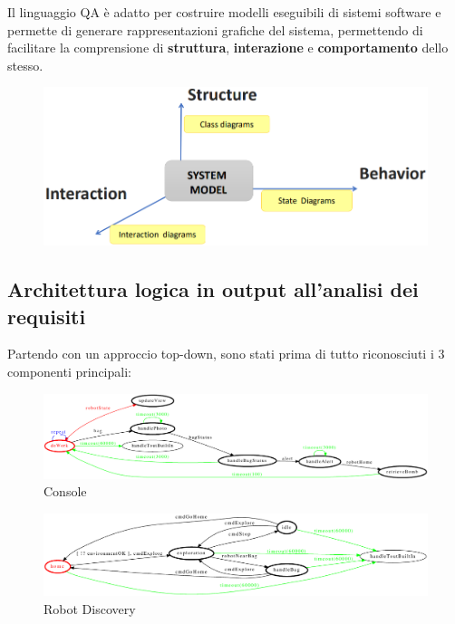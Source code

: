 Il linguaggio QA è adatto per costruire modelli eseguibili di sistemi software e permette di generare rappresentazioni grafiche del sistema,
permettendo di facilitare la comprensione di \textbf{struttura}, \textbf{interazione} e \textbf{comportamento} dello stesso.

\begin{figure}[H]
  \centering
  \includegraphics[width=1\textwidth]{res/logicalArchitecture.png}%
  \label{fig:logicalArchitecture}
\end{figure}

\subsection{Architettura logica in output all'analisi dei requisiti}

Partendo con un approccio top-down, sono stati prima di tutto riconosciuti i 3 componenti principali:

\begin{figure}[H]
  \centering
  \includegraphics[width=\textwidth]{res/sprint1/requirements/console}
  \caption{Console}%
  \label{fig:sp1:req:console}
\end{figure}

\begin{figure}[H]
  \centering
  \includegraphics[width=\textwidth]{res/sprint1/requirements/robotdiscovery}
  \caption{Robot Discovery}%
  \label{fig:sp1:req:robotdiscovery}
\end{figure}

